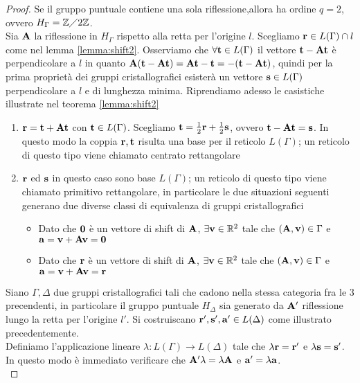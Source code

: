 \documentclass[a4paper,11pt,openright,twoside	]{book}
\begin{document}
\begin{proof}
Se il gruppo puntuale contiene una sola riflessione,allora ha ordine $q = 2$, ovvero $H_{\Gamma} = \mathbb{Z} \diagup 2 \mathbb{Z}$.\\
 Sia $\vb{A}$ la riflessione in $H_{\Gamma}$ rispetto alla retta per l'origine $l$. Scegliamo $\vb{r} \in L(\Gamma) \cap l$ come nel lemma \ref{lemma:shift2}. 
Osserviamo che $\forall \vb{t} \in L(\Gamma)$ il vettore $\vb{t - At}$ è perpendicolare a $l$ in quanto $\vb{A(t - At) = At - t = - (t-At)}$, quindi per la prima proprietà dei gruppi cristallografici esisterà un vettore $\vb{s} \in L(\Gamma)$ perpendicolare a $l$ e di lunghezza minima. 
Riprendiamo adesso le casistiche illustrate nel teorema \ref{lemma:shift2}
\begin{enumerate}
\item  $\vb{r} = \vb{t + At}$ con $\vb{t} \in L(\Gamma)$. Scegliamo $\vb{t} = \frac{1}{2}\vb{r} + \frac{1}{2} \vb{s}$, ovvero $\vb{t} - \vb{At} = \vb{s}$. In questo modo la coppia $\vb{r,t}$ risulta una base per il reticolo $L(\Gamma)$; un reticolo di questo tipo viene chiamato centrato rettangolare
 \item $\vb{r}$ ed $\vb{s}$ in questo caso sono base $L(\Gamma)$; un reticolo di questo tipo viene chiamato primitivo rettangolare, in particolare le due situazioni seguenti generano due diverse classi di equivalenza di gruppi cristallografici
 \begin{itemize}
 \item Dato che $\vb{0}$ è un vettore di shift di $\vb{A}$, $\exists \vb{v} \in \mathbb{R}^2$ tale che $\vb{(A,v)} \in \Gamma$ e $\vb{a} = \vb{v + Av} = \vb{0}$
 \item Dato che $\vb{r}$ è un vettore di shift di $\vb{A}$, $\exists \vb{v} \in \mathbb{R}^2$ tale che $\vb{(A,v)} \in \Gamma$ e $\vb{a} = \vb{v + Av} = \vb{r}$
 \end{itemize}
\end{enumerate}
Siano $\Gamma, \Delta$ due gruppi cristallografici tali che cadono nella stessa categoria fra le 3 precendenti, in particolare il gruppo puntuale $H_{\Delta}$ sia generato da $\vb{A'}$ riflessione lungo la retta per l'origine $l'$. Si costruiscano $\vb{r', s', a'} \in L(\Delta)$ come illustrato precedentemente.\\
Definiamo l'applicazione lineare $\lambda: L(\Gamma) \longrightarrow L(\Delta)$ tale che $\lambda \vb{r}= \vb{r'}$ e $\lambda \vb{s}= \vb{s'}$. In questo modo è immediato verificare che $\vb{A'} \lambda = \lambda \vb{A}$ e $\vb{a'} = \lambda \vb{a}$. \\

\end{proof}
\end{document}
